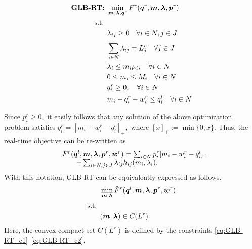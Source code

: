 \vspace{0.1in}
\begin{subequations}
	\begin{align}
	\text{\bf{GLB-RT}: } &  \min_{\boldsymbol{m}, \boldsymbol{\lambda}, \boldsymbol{q}^r} F^r(\boldsymbol{q}^r, \boldsymbol{m},\boldsymbol{\lambda},\boldsymbol{p}^r) \nonumber \\
	\mbox{s.t. } \nonumber \\
	\label{eq:GLB-RT_c1}
	&\lambda_{ij} \geq 0  \quad \forall i \in N,j \in J \\
	&\sum_{i\in N}^{} \lambda_{ij} = L^r_j \quad \forall j \in J \\
	\label{eq:GLB-RT_c}
	&\lambda_i \leq m_i \mu_i,   \quad \forall i \in N\\
	&0 \leq m_i \leq M_i \quad \forall i \in N \\
	\label{eq:GLB-RT_c2}
	&q^r_i \geq 0, \quad \forall i \in N \\
	\label{eq:GLB-RT_c3}
	& m_i - q^r_i - w^r_i \leq q^l_i \quad \forall i \in N
	\end{align}
\end{subequations}
\vspace{0.1in}

Since $p^r_i \geq 0,$ it easily follows that any solution of the above optimization problem satisfies $q^r_i =[m_i - w^r_i - q^l_i]_+,$ where $[x]_+ := \min\{0,x\}.$ Thus, the real-time objective can be re-written as 
\begin{equation}
\label{eq:rt-obj2}
\begin{array}{rl}
&\tilde{F}^r(\boldsymbol{q}^l,\boldsymbol{m},\boldsymbol{\lambda},\boldsymbol{p}^r,\boldsymbol{w}^r) = \sum_{i \in N} p^r_i [m_i - w^r_i - q^l_i]_+ \\
& \qquad+ \sum_{i\in N, j \in J}
\lambda_{ij}h_{ij}(m_i,\lambda_i).    
\end{array}
\end{equation}
With this notation, GLB-RT can be equivalently expressed as follows.
\begin{subequations}
	\begin{align*}
	& \min_{\boldsymbol{m}, \boldsymbol{\lambda}} \tilde{F}^r(\boldsymbol{q}^l,\boldsymbol{m},\boldsymbol{\lambda},\boldsymbol{p}^r,\boldsymbol{w}^r) \\
	\mbox{s.t. } \nonumber \\
	&(\boldsymbol{m},\boldsymbol{\lambda}) \in C(L^r).
	\end{align*}
\end{subequations}
Here, the convex compact set $C(L^r)$ is defined by the constraints
\eqref{eq:GLB-RT_c1}--\eqref{eq:GLB-RT_c2}.



